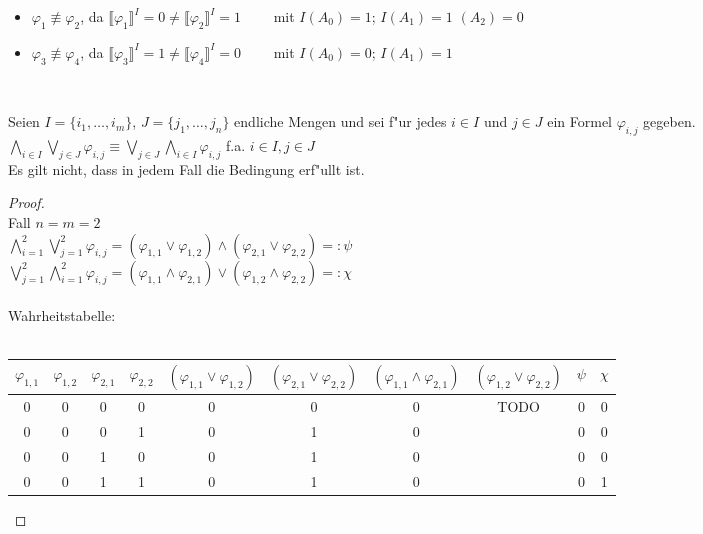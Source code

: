 \documentclass[a4paper,10pt]{article}
\begin{document}
	\begin{compactenum} [(a)]
		\item
		\begin{itemize}
			\item $ \varphi_1 \not\equiv \varphi_2$, da $ \llbracket \varphi_1 \rrbracket ^I = 0 \neq \llbracket \varphi_2 \rrbracket ^I = 1 \qquad$ mit $ I(A_0) = 1 $; $ I(A_1) = 1 $ $ (A_2) = 0 $
			\item $ \varphi_3 \not\equiv \varphi_4$, da $ \llbracket \varphi_3 \rrbracket ^I = 1 \neq \llbracket \varphi_4 \rrbracket ^I = 0 \qquad$ mit $ I(A_0) = 0 $; $ I(A_1) = 1 $
		\end{itemize}\
		\item Seien $I = \{i_1, \dots , i_m\}$,  $J = \{j_1, \dots , j_n\} $ endliche Mengen und sei f"ur jedes $i \in I$ und $j \in J$ ein Formel $\varphi_{i, j}$ gegeben.\\
		$\bigwedge\limits_{i \in I} \bigvee\limits_{j \in J} \varphi_{i, j} \equiv \bigvee\limits_{j \in J} \bigwedge\limits_{i \in I} \varphi_{i, j}$ f.a. $i \in I, j\in J$\\
		Es gilt nicht, dass in jedem Fall die Bedingung erf"ullt ist.
		\begin{proof}\ \\
			Fall $n = m = 2$\\
			$\bigwedge\limits_{i = 1}^2 \bigvee\limits_{j = 1}^2 \varphi_{i, j} = (\varphi_{1,1} \vee \varphi_{1,2}) \wedge (\varphi_{2,1} \vee \varphi_{2,2}) =: \psi$\\
		    $\bigvee\limits_{j = 1}^2 \bigwedge\limits_{i = 1}^2  \varphi_{i, j} = (\varphi_{1,1} \wedge \varphi_{2,1}) \vee (\varphi_{1,2} \wedge \varphi_{2,2}) =: \chi$\\\\
		    Wahrheitstabelle:\\ \\
		   \begin{tabular}{cccc|c|c|c|c|c|c}
		   	$\varphi_{1,1}$ & $\varphi_{1,2}$ & $\varphi_{2,1}$ & $\varphi_{2,2}$ & $(\varphi_{1,1} \vee \varphi_{1,2})$ & $(\varphi_{2,1} \vee \varphi_{2,2})$ & $(\varphi_{1,1} \wedge \varphi_{2,1})$ & $(\varphi_{1,2} \vee \varphi_{2,2})$ & $\psi$ & $\chi$ \\ \hline
		   	0 & 0 & 0 & 0 & 0 & 0 & 0 & TODO & 0 & 0\\
		   	0 & 0 & 0 & 1 & 0 & 1 & 0 &  & 0 & 0\\
		   	0 & 0 & 1 & 0 & 0 & 1 & 0 &  & 0 & 0\\
		   	0 & 0 & 1 & 1 & 0 & 1 & 0 &  & 0 & 1\\

\end{tabular}
\end{proof}
\end{compactenum}
\end{document}
